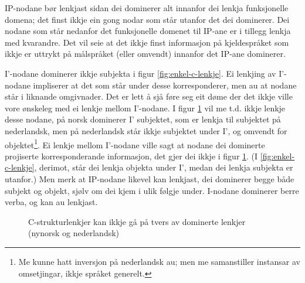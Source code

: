 \documentclass[12pt,a4paper,oneside,draft]{report}
\newcommand{\proj}[2]{\begin{tabular}{c}\footnotesize{#1}\\\normalsize{#2}\end{tabular}}
\newcommand{\ua}{\ensuremath{\uparrow}}
\newcommand{\da}{\ensuremath{\downarrow}}
\begin{document}
IP-nodane bør lenkjast sidan dei dominerer alt innanfor dei
lenkja funksjonelle domena; det finst ikkje ein gong nodar som står
utanfor det dei dominerer. Dei nodane som står nedanfor det funksjonelle
domenet til IP-ane er i tillegg lenkja med kvarandre. Det vil seie at
det ikkje finst informasjon på kjeldespråket som ikkje er uttrykt på
målspråket (eller omvendt) innanfor det IP-ane dominerer.

I'-nodane dominerer ikkje subjekta i figur
 \ref{fig:enkel-c-lenkje}. Ei lenkjing av I'-nodane impliserer at det
 som står under desse korresponderer, men au at nodane står i liknande
 omgivnader. Det er lett å sjå føre seg eit døme der det ikkje ville
 vore ønskeleg med ei lenkje mellom I'-nodane. I figur
 \ref{fig:ikkje-c-lenkje} vil me t.d. ikkje lenkje desse nodane, på
 norsk dominerer I' subjektet, som er lenkja til subjektet på
 nederlandsk, men på nederlandsk står ikkje subjektet under I', og
 omvendt for objektet\footnote{Me kunne hatt inversjon på nederlandsk au; men me samanstiller
        instansar av omsetjingar, ikkje språket generelt. }. Ei lenkje mellom I'-nodane ville sagt at
 nodane dei dominerte projiserte korresponderande informasjon, det
 gjer dei ikkje i figur \ref{fig:ikkje-c-lenkje}. (I
 \ref{fig:enkel-c-lenkje}, derimot, står dei lenkja objekta under I',
 medan dei lenkja subjekta er utanfor.) Men merk at IP-nodane likevel
 kan lenkjast, dei dominerer begge både subjekt og objekt, sjølv om
 dei kjem i ulik følgje under.  I-nodane dominerer berre verba, og kan
 au lenkjast.

\begin{figure}[htp]
\centering
   \caption{C-strukturlenkjer kan ikkje gå på tvers av dominerte
   lenkjer (nynorsk og nederlandsk)}
   \label{fig:ikkje-c-lenkje}
  \end{figure}
\end{document}
